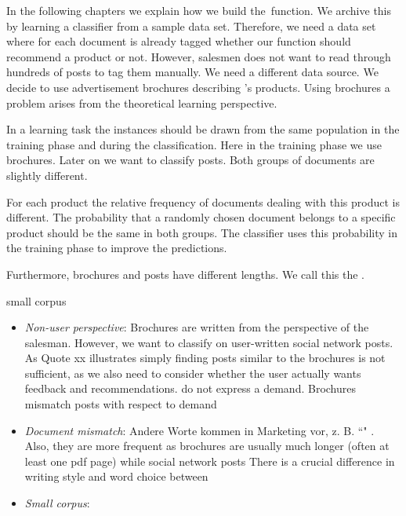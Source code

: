 In the following chapters we explain how we build the~\nto function.
We archive this by learning a classifier from a sample data set. 
Therefore, we need a data set where for each document is already tagged whether our \nto function should recommend a product or not.
However, salesmen does not want to read through hundreds of posts to tag them manually.
We need a different data source.
We decide to use advertisement brochures describing \acme's products. 
Using brochures a problem arises from the theoretical learning perspective.

In a learning task the instances should be drawn from the same population in the training phase and during the classification.\nr
Here in the training phase we use brochures. Later on we want to classify posts. 
Both groups of documents are slightly different. 

For each product the relative frequency of documents dealing with this product is different.
The probability that a randomly chosen document belongs to a specific product should be the same in both groups.
The classifier uses this probability in the training phase to improve the predictions.\nr

Furthermore, brochures and posts have different lengths.
We call this the .



small corpus

 \begin{itemize}
 	\item \emph{Non-user perspective}: Brochures are written from the perspective of the salesman. However, we want to classify on user-written social network posts.
 	As Quote xx illustrates simply finding posts similar to the brochures is not sufficient, as we also need to consider whether the user actually wants feedback and recommendations.
 	do not express a demand. Brochures mismatch posts with respect to demand
	\item \emph{Document mismatch}: Andere Worte kommen in Marketing vor, z. B. ``" . Also, they are more frequent as brochures are usually much longer (often at least one pdf page) while social network posts 
	There is a crucial difference in writing style and word choice between 
	\item \emph{Small corpus}: 
 \end{itemize}

